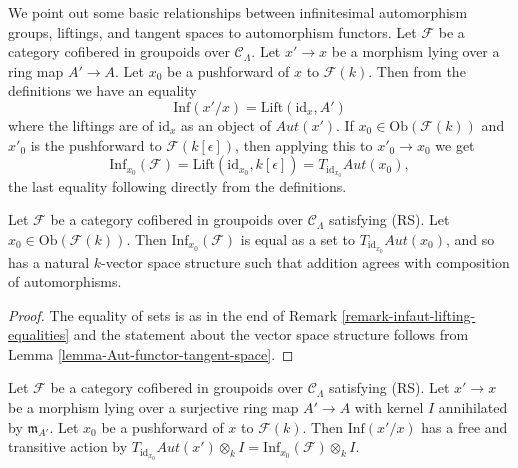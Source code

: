 \begin{remark}
\label{remark-infaut-lifting-equalities}
We point out some basic relationships between infinitesimal automorphism 
groups, liftings, and tangent spaces to automorphism functors. Let
$\mathcal{F}$ be a category cofibered in groupoids over $\mathcal{C}_\Lambda$.
Let $x' \to x$ be a morphism lying over a ring map $A' \to A$.  Let
$x_0$ be a pushforward of $x$ to $\mathcal{F}(k)$.
Then from the definitions we have an equality
$$
\text{Inf}(x'/x) = \text{Lift}(\text{id}_{x}, A')
$$
where the liftings are of $\text{id}_{x}$ as an object of 
$\mathit{Aut}(x')$.  If $x_0 \in \text{Ob}(\mathcal{F}(k))$ and $x'_0$ 
is the pushforward to $\mathcal{F}(k[\epsilon])$, then applying this to
$x'_0 \to x_0$ we get 
$$
\text{Inf}_{x_0}(\mathcal{F}) = 
\text{Lift}(\text{id}_{x_0}, k[\epsilon]) = 
T_{\text{id}_{x_0}} \mathit{Aut}(x_0),
$$
the last equality following directly from the definitions.
\end{remark}

\begin{lemma}
\label{lemma-infaut-vector-space}
Let $\mathcal{F}$ be a category cofibered in groupoids over
$\mathcal{C}_\Lambda$ satisfying (RS). Let $x_0 \in \text{Ob}(\mathcal{F}(k))$.
Then $\text{Inf}_{x_0}(\mathcal{F})$ is equal as a set to
$T_{\text{id}_{x_0}} \mathit{Aut}(x_0)$, and so has a natural $k$-vector
space structure such that addition agrees with composition of automorphisms.
\end{lemma}

\begin{proof}
The equality of sets is as in the end of
Remark \ref{remark-infaut-lifting-equalities}
and the statement about the vector space structure follows from
Lemma \ref{lemma-Aut-functor-tangent-space}.
\end{proof} 

\begin{lemma}
\label{lemma-lifted-automorphisms-torsor}
Let $\mathcal{F}$ be a category cofibered in groupoids over
$\mathcal{C}_\Lambda$ satisfying (RS). Let $x' \to x$ be a 
morphism lying over a surjective ring map $A' \to A$ with kernel $I$
annihilated by $\mathfrak m_{A'}$. Let $x_0$ be a pushforward of $x$ to
$\mathcal{F}(k)$. Then $\text{Inf}(x'/x)$ has a free and transitive action by 
$T_{\text{id}_{x_0}} \mathit{Aut}(x') \otimes_k I
= \text{Inf}_{x_0}(\mathcal{F}) \otimes_k I$.
\end{lemma}


